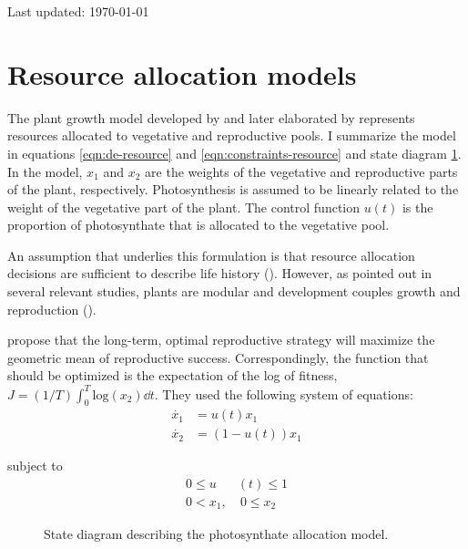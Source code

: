 \documentclass[12pt, oneside]{article}   	%
\begin{document}
 
 
   	Last updated: \today

\section*{Resource allocation models}

The plant growth model developed by \cite{cohen1971} and later elaborated by \cite{King1982a} represents resources allocated to vegetative and reproductive pools. I summarize the model in equations \ref{eqn:de-resource} and \ref{eqn:constraints-resource} and state diagram \ref{fig:state-resource}. In the model, $x_1$ and $x_2$ are the weights of the vegetative and reproductive parts of the plant, respectively. Photosynthesis is assumed to be linearly related to the weight of the vegetative part of the plant. The control function $u(t)$ is the proportion of photosynthate that is allocated to the vegetative pool. 

An assumption that underlies this formulation is that resource allocation decisions are sufficient to describe life history (\cite{fox1990}). However, as pointed out in several relevant studies, plants are modular and development couples growth and reproduction (\cite{watson1984,geber1990,fox1990}). 

\cite{King1982a} propose that the long-term, optimal reproductive strategy will maximize the geometric mean of reproductive success. Correspondingly, the function that should be optimized is the expectation of the log of fitness, $ J = (1/T) \int_{0}^{T} \mathrm{log}(x_2) \dd {t}$. They used the following system of equations:
%
\begin{align}
\dot{x_1} & = u(t) x_1 \nonumber \\
\dot{x_2} & = (1-u(t)) x_1 
\label{eqn:de-resource}
\end{align}

\noindent subject to
%
\begin{align}
0 \leq u&(t)  \leq 1 \nonumber \\
0  < x_1,&\ 0  \leq x_2 
\label{eqn:constraints-resource}
\end{align}

\begin{figure}[!h]
\centering
{}
  \caption{State diagram describing the photosynthate allocation model.}
  \label{fig:state-resource}
\end{figure}
\end{document}
